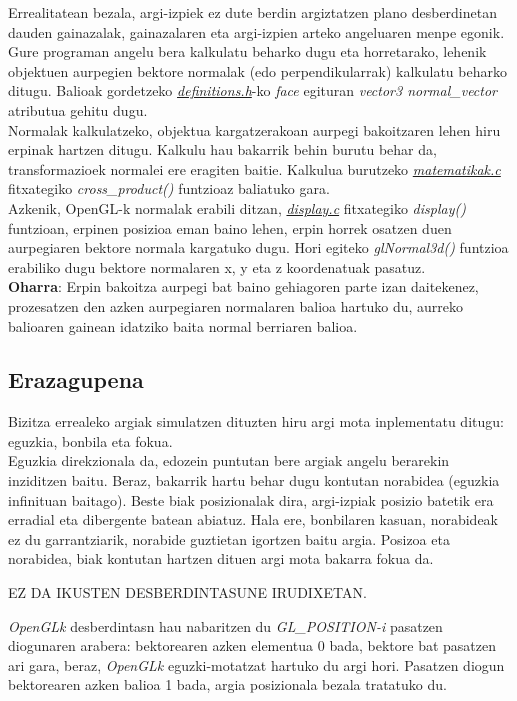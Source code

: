 \documentclass[12pt]{article}
\newcommand{\fitxategi}[1] {\underline{\textit{#1}}}
\newcommand{\metodo}[1] {\textit{#1}}
\newcommand{\aldagai}[1] {\textit{#1}}
\begin{document}
Errealitatean bezala, argi-izpiek ez dute berdin argiztatzen plano desberdinetan dauden gainazalak, gainazalaren eta argi-izpien arteko angeluaren menpe egonik. Gure programan angelu bera kalkulatu beharko dugu eta horretarako, lehenik objektuen aurpegien bektore normalak (edo perpendikularrak) kalkulatu beharko ditugu. Balioak gordetzeko \fitxategi{definitions.h}-ko \aldagai{face} egituran \aldagai{vector3 normal\_vector} atributua gehitu dugu.\\

Normalak kalkulatzeko, objektua kargatzerakoan aurpegi bakoitzaren lehen hiru erpinak hartzen ditugu. Kalkulu hau bakarrik behin burutu behar da, transformazioek normalei ere eragiten baitie. Kalkulua burutzeko \fitxategi{matematikak.c} fitxategiko \metodo{cross\_product()} funtzioaz baliatuko gara.\\

Azkenik, OpenGL-k normalak erabili ditzan, \fitxategi{display.c} fitxategiko \metodo{display()} funtzioan, erpinen posizioa eman baino lehen, erpin horrek osatzen duen aurpegiaren bektore normala kargatuko dugu. Hori egiteko \metodo{glNormal3d()} funtzioa erabiliko dugu bektore normalaren x, y eta z koordenatuak pasatuz.\\

\textbf{Oharra}: Erpin bakoitza aurpegi bat baino gehiagoren parte izan daitekenez, prozesatzen den azken aurpegiaren normalaren balioa hartuko du, aurreko balioaren gainean idatziko baita normal berriaren balioa.
 
\subsection{Erazagupena}

Bizitza errealeko argiak simulatzen dituzten hiru argi mota inplementatu ditugu: eguzkia, bonbila eta fokua.\\

Eguzkia direkzionala da, edozein puntutan bere argiak angelu berarekin inziditzen baitu. Beraz, bakarrik hartu behar dugu kontutan norabidea (eguzkia infinituan baitago). Beste biak posizionalak dira, argi-izpiak posizio batetik era erradial eta dibergente batean abiatuz. Hala ere, bonbilaren kasuan, norabideak ez du garrantziarik, norabide guztietan igortzen baitu argia. Posizoa eta norabidea, biak kontutan hartzen dituen argi mota bakarra fokua da.


EZ DA IKUSTEN DESBERDINTASUNE IRUDIXETAN.

\aldagai{OpenGLk} desberdintasn hau nabaritzen du \aldagai{GL\_POSITION-i} pasatzen diogunaren arabera: bektorearen azken elementua 0 bada, bektore bat pasatzen ari gara, beraz, \aldagai{OpenGLk} eguzki-motatzat hartuko du argi hori. Pasatzen diogun bektorearen azken balioa 1 bada, argia posizionala bezala tratatuko du.\\
\end{document}
